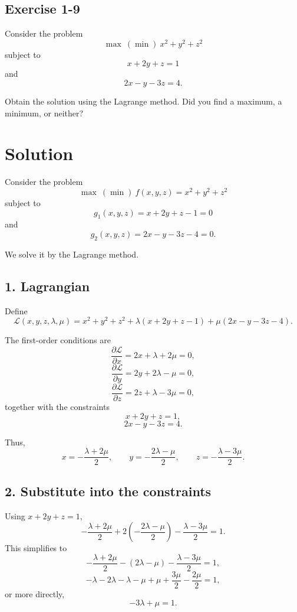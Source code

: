 \vspace{30pt}
\begin{tcolorbox}[breakable]

\subsection*{Exercise 1-9}

Consider the problem
\[
\max \ (\min)\ x^2 + y^2 + z^2
\]
subject to
\[
x + 2y + z = 1
\]
and
\[
2x - y - 3z = 4.
\]

Obtain the solution using the Lagrange method.
Did you find a maximum, a minimum, or neither?

\end{tcolorbox}



\section*{Solution}

Consider the problem
\[
\max \ (\min)\ f(x,y,z)=x^2+y^2+z^2
\]
subject to
\[
g_1(x,y,z)=x+2y+z-1=0
\]
and
\[
g_2(x,y,z)=2x-y-3z-4=0.
\]

We solve it by the Lagrange method.

\subsection*{1. Lagrangian}

Define
\[
\mathcal{L}(x,y,z,\lambda,\mu)
=
x^2+y^2+z^2
+\lambda(x+2y+z-1)
+\mu(2x-y-3z-4).
\]

The first-order conditions are
\[
\frac{\partial \mathcal{L}}{\partial x}=2x+\lambda+2\mu=0,
\]
\[
\frac{\partial \mathcal{L}}{\partial y}=2y+2\lambda-\mu=0,
\]
\[
\frac{\partial \mathcal{L}}{\partial z}=2z+\lambda-3\mu=0,
\]
together with the constraints
\[
x+2y+z=1,
\]
\[
2x-y-3z=4.
\]

Thus,
\[
x=-\frac{\lambda+2\mu}{2},\qquad
y=-\frac{2\lambda-\mu}{2},\qquad
z=-\frac{\lambda-3\mu}{2}.
\]

\subsection*{2. Substitute into the constraints}

Using \(x+2y+z=1\),
\[
-\frac{\lambda+2\mu}{2}
+2\left(-\frac{2\lambda-\mu}{2}\right)
-\frac{\lambda-3\mu}{2}
=1.
\]
This simplifies to
\[
-\frac{\lambda+2\mu}{2}-(2\lambda-\mu)-\frac{\lambda-3\mu}{2}=1,
\]
\[
-\lambda-2\lambda-\lambda-\mu+\mu+\frac{3\mu}{2}-\frac{2\mu}{2}=1,
\]
or more directly,
\[
-3\lambda+\mu=1. \tag{1}
\]

